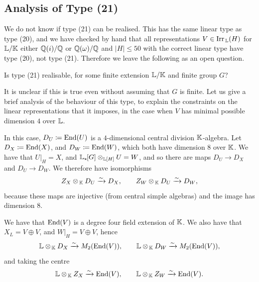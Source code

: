 \subsection{Analysis of Type (21)}

We do not know if type (21) can be realised. This has the same linear type as type (20), and we have checked by hand that all representations $V \in \operatorname{Irr}_{\, {\mathbb L}}(H)$ for ${\mathbb L} / {\mathbb K}$ either ${\mathbb Q}(i) / {\mathbb Q}$ or ${\mathbb Q}(\omega) / {\mathbb Q}$ and $|H| \leq 50$ with the correct linear type have type (20), not type (21). Therefore we leave the following as an open question.

\begin{prob}\label{prob:case21}
Is type (21) realisable, for some finite extension ${\mathbb L} / {\mathbb K}$ and finite group $G$?
\end{prob}

It is unclear if this is true even without assuming that $G$ is finite. Let us give a brief analysis of the behaviour of this type, to explain the constraints on the linear representations that it imposes, in the case when $V$ has minimal possible dimension $4$ over ${\mathbb L}$.

In this case, $D_U \coloneqq \operatorname{End}(U)$ is a $4$-dimensional central division ${\mathbb K}$-algebra. Let $D_X \coloneqq \operatorname{End}(X)$, and $D_W \coloneqq \operatorname{End}(W)$, which both have dimension $8$ over ${\mathbb K}$. We have that $U|_H = X$, and ${\mathbb L}_{\star \hspace{-0.1em}}[G] \otimes_{{\mathbb L}[H]} U = W$, and so there are maps $D_U \rightarrow D_X$ and $D_U \rightarrow D_W$. We therefore have isomorphisms
\[
Z_X \otimes_{\, {\mathbb K}} D_U \xrightarrow{\sim} D_X, \qquad Z_W \otimes_{\, {\mathbb K}} D_U \xrightarrow{\sim} D_W,
\]
because these maps are injective (from central simple algebras) and the image has dimension $8$.

We have that $\operatorname{End}(V)$ is a degree four field extension of ${\mathbb K}$. We also have that $X_L = V \oplus V$, and $W|_H = V \oplus V$, hence
\[
{\mathbb L} \otimes_{\, {\mathbb K}} D_X \xrightarrow{\sim} M_2(\operatorname{End}(V)), \qquad {\mathbb L} \otimes_{\, {\mathbb K}} D_W \xrightarrow{\sim} M_2(\operatorname{End}(V)),
\]
and taking the centre
\[
{\mathbb L} \otimes_{\, {\mathbb K}} Z_X \xrightarrow{\sim} \operatorname{End}(V), \qquad {\mathbb L} \otimes_{\, {\mathbb K}} Z_W \xrightarrow{\sim} \operatorname{End}(V).
\]

